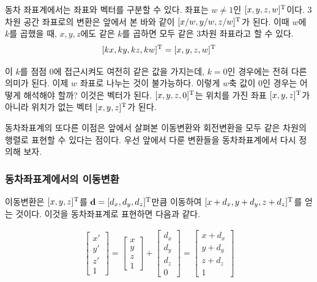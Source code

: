 동차 좌표계에서는 좌표와 벡터를 구분할 수 있다. 좌표는 $w \neq 1$인 $[x,y,z,w]^{\rm T}$이다. 3차원 공간 좌표로의 변환은 앞에서 본 바와 같이 
$[x/w, y/w, z/w]^{\rm T}$가 된다. 이때 $w$에 $k$를 곱했을 때, $x,y,z$에도 같은 $k$를 곱하면 모두 같은 3차원 좌표라고 할 수 있다.
$$[kx,ky,kz,kw]^{\rm T} = [x,y,z,w]^{\rm T}$$

이 $k$를 점점 0에 접근시켜도 여전히 같은 값을 가지는데, $k=0$인 경우에는 전혀 다른 의미가 된다.
이제 $w$ 좌표로 나누는 것이 불가능하다. 
이렇게 $w$축 값이 0인 경우는 어떻게 해석해야 할까? 이것은 벡터가 된다. 
$[x,y,z,0]^{\rm T}$는 위치를 가진 좌표 $[x,y,z]^{\rm T}$가 아니라 위치가 없는 벡터 $[x,y,z]^{\rm T}$가 된다.


동차좌표계의 또다른 이점은 앞에서 살펴본 이동변환와 회전변환을 모두 같은 차원의 행렬로 표현할 수 있다는 점이다.
우선 앞에서 다룬 변환들을 동차좌표계에서 다시 정의해 보자.

\subsubsection{동차좌표계에서의 이동변환}

이동변환은 $[x,y,z]^{\rm T}$를 $\mathbf d=[d_x, d_y, d_z]^{\rm T}$만큼 이동하여 $[x+d_x, y+d_y, z+d_z]^{\rm T}$를 얻는 것이다.
이것을 동차좌표계로 표현하면 다음과 같다.

\begin{eqnarray}
\left [
\begin{array}{c}
x' \\y' \\ z' \\ 1
\end{array}
\right ]
=
\left [
\begin{array}{c}
x \\ y \\ z \\ 1
\end{array}
\right ]
+
\left [
\begin{array}{c}
d_x \\ d_y \\ d_z \\ 0
\end{array}
\right ]
=
\left [
\begin{array}{c}
x+d_x \\ y+d_y \\ z+d_z \\ 1
\end{array}
\right ]
\end{eqnarray}


